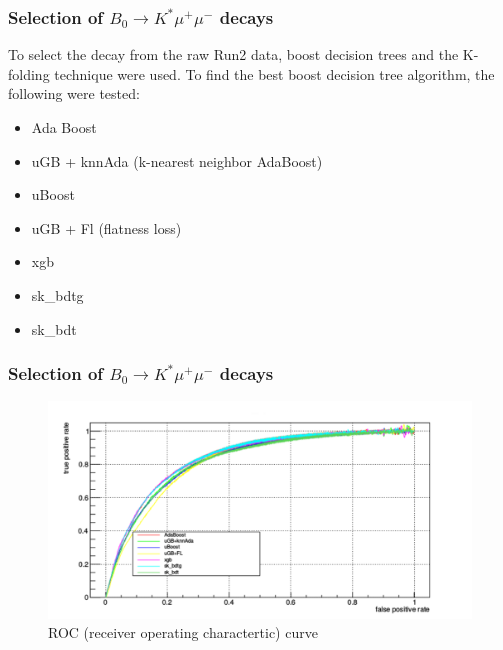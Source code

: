 \documentclass{beamer}
\begin{document}
\begin{frame}
  \frametitle{Selection of $B_0 \rightarrow K^* \mu^+ \mu^-$ decays}

To select the decay from the raw Run2 data, boost decision trees and the K-folding technique were used. To find the best boost decision tree algorithm, the following were tested:

\begin{itemize}
 \item Ada Boost
 \item uGB  + knnAda (k-nearest neighbor AdaBoost)
 \item uBoost
 \item uGB  + Fl (flatness loss)
 \item xgb
 \item sk\_bdtg
 \item sk\_bdt
\end{itemize}

\end{frame}



\begin{frame}
  \frametitle{Selection of $B_0 \rightarrow K^* \mu^+ \mu^-$ decays}

  \begin{figure}
   \includegraphics[width= 1.0\linewidth]{figures/roc}
   \caption{ROC (receiver operating charactertic) curve}
  \end{figure}

\end{frame}


\end{document}
